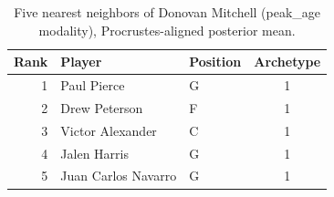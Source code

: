 \begin{table}[htbp]
  \centering\small
  \begin{tabular}{rllc}
    \toprule
    Rank & Player & Position & Archetype \\
    \midrule
    1 & Paul Pierce & G & 1 \\
    2 & Drew Peterson & F & 1 \\
    3 & Victor Alexander & C & 1 \\
    4 & Jalen Harris & G & 1 \\
    5 & Juan Carlos Navarro & G & 1 \\
    \bottomrule
  \end{tabular}
  \caption{Five nearest neighbors of Donovan Mitchell (peak_age modality), Procrustes-aligned posterior mean.}
  \label{tab:Donovan_Mitchell_neighbors_peak_age}
\end{table}


